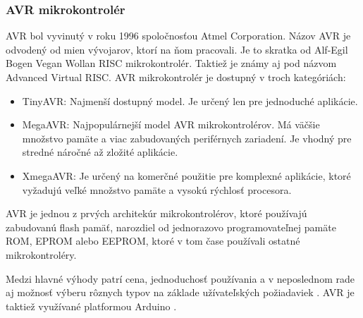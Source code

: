 \subsubsection{AVR mikrokontrolér}
\noindent
AVR bol vyvinutý v roku 1996 spoločnosťou Atmel Corporation. Názov AVR je odvodený od mien vývojarov, ktorí na ňom pracovali.
Je to skratka od  Alf-Egil Bogen Vegan Wollan RISC mikrokontrolér.
Taktiež je známy aj pod názvom Advanced Virtual RISC. AVR mikrokontrolér je dostupný v troch kategóriách:
\begin{itemize}
    \item TinyAVR: Najmenší dostupný model. Je určený len pre jednoduché aplikácie.
    \item MegaAVR: Najpopulárnejší model AVR mikrokontrolérov. Má väčšie množstvo pamäte a viac zabudovaných periférnych zariadení. Je vhodný pre stredné náročné až zložité aplikácie.
    \item XmegaAVR: Je určený na komerčné použitie pre komplexné aplikácie, ktoré vyžadujú veľké množstvo pamäte a vysokú rýchlosť procesora.
\end{itemize}

AVR je jednou z prvých architekúr mikrokontrolérov, ktoré používajú zabudovanú flash pamäť, narozdiel od jednorazovo programovateľnej pamäte ROM, EPROM alebo EEPROM, ktoré v tom čase používali ostatné mikrokontroléry.
\par
Medzi hlavné výhody patrí cena, jednoduchosť používania a v neposlednom rade aj možnosť výberu rôznych typov na základe užívateľských požiadaviek \cite{shidlingDifferentTypesMicrocontrollers2020}. AVR je taktiež využívané platformou Arduino \cite{AVRVsArduinoWhich2017}.




